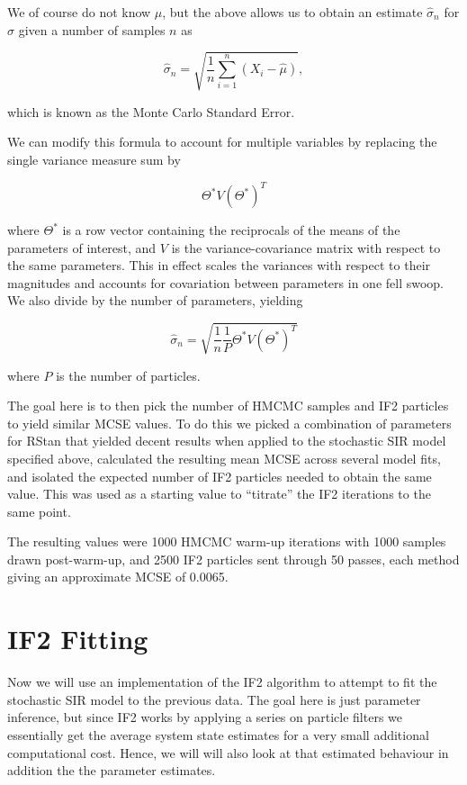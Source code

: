 	We of course do not know $\mu$, but the above allows us to obtain an estimate $\hat{\sigma}_n$ for $\sigma$ given a number of samples $n$ as

	\begin{equation}
		\hat{\sigma}_n = \sqrt{\frac{1}{n} \sum_{i=1}^{n} (X_i - \hat{\mu}) },
	\end{equation}

	which is known as the Monte Carlo Standard Error.

	We can modify this formula to account for multiple variables by replacing the single variance measure sum by

	\begin{equation}
		\Theta^* V (\Theta^*)^T
	\end{equation}

	where $\Theta^*$ is a row vector containing the reciprocals of the means of the parameters of interest, and $V$ is the variance-covariance matrix with respect to the same parameters. This in effect scales the variances with respect to their magnitudes and accounts for covariation between parameters in one fell swoop. We also divide by the number of parameters, yielding

	\begin{equation}
		\hat{\sigma}_n = \sqrt{\frac{1}{n} \frac{1}{P} \Theta^* V (\Theta^*)^T }
	\end{equation}

	where $P$ is the number of particles.

	The goal here is to then pick the number of HMCMC samples and IF2 particles to yield similar MCSE values. To do this we picked a combination of parameters for RStan that yielded decent results when applied to the stochastic SIR model specified above, calculated the resulting mean MCSE across several model fits, and isolated the expected number of IF2 particles needed to obtain the same value. This was used as a starting value to ``titrate'' the IF2 iterations to the same point.

	The resulting values were 1000 HMCMC warm-up iterations with 1000 samples drawn post-warm-up, and 2500 IF2 particles sent through 50 passes, each method giving an approximate MCSE of 0.0065.


\section{IF2 Fitting}

	Now we will use an implementation of the IF2 algorithm to attempt to fit the stochastic SIR model to the previous data. The goal here is just parameter inference, but since IF2 works by applying a series on particle filters we essentially get the average system state estimates for a very small additional computational cost. Hence, we will will also look at that estimated behaviour in addition the the parameter estimates.

